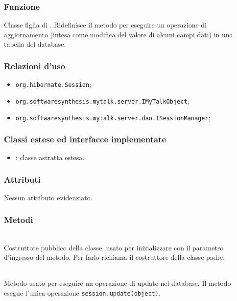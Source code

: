 
\subsubsection*{Funzione}
Classe figlia di . Ridefinisce il metodo  per eseguire un operazione di aggiornamento (intesa come modifica del valore di alcuni campi dati) in una tabella del database.

\subsubsection*{Relazioni d'uso}

\begin{itemize}
		\item \texttt{org.hibernate.Session};
		\item \texttt{org.softwaresynthesis.mytalk.server.IMyTalkObject};
		\item \texttt{org.softwaresynthesis.mytalk.server.dao.ISessionManager};
\end{itemize}

\subsubsection*{Classi estese ed interfacce implementate}

\begin{itemize}
	\item {}: classe astratta estesa.
\end{itemize}

\subsubsection*{Attributi}

Nessun attributo evidenziato.

\subsubsection*{Metodi}

\begin{description}
	\item{}\\
	Costruttore pubblico della classe, usato per inizializzare  con il parametro d'ingresso del metodo. Per farlo richiama il costruttore della classe padre.

	\item{}\\
	Metodo usato per eseguire un operazione di update nel database. Il metodo esegue l'unica operazione \verb|session.update(object)|.

\end{description}

